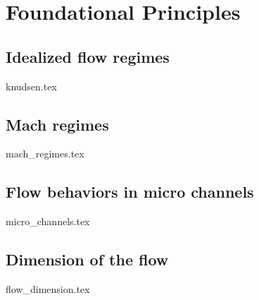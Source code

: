 \section{Foundational Principles}

\subsection{Idealized flow regimes}
{knudsen.tex}
\newpage

\subsection{Mach regimes}
{mach_regimes.tex}
\newpage

\subsection{Flow behaviors in micro channels}
{micro_channels.tex}
\newpage

\subsection{Dimension of the flow}
{flow_dimension.tex}
\newpage
